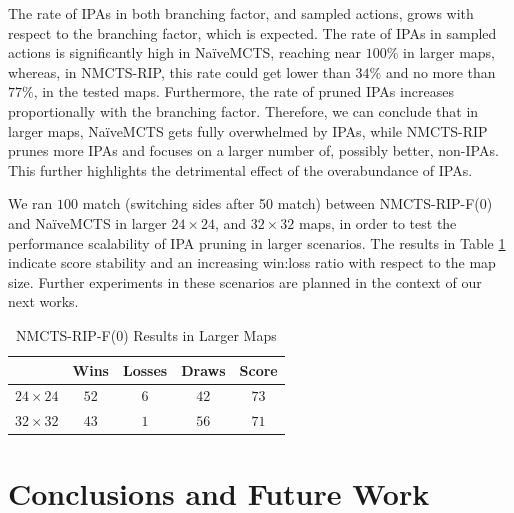 \documentclass[conference]{IEEEtran}
\begin{document}
The rate of IPAs in both branching factor, and sampled actions, grows with respect to the branching factor, which is expected. The rate of IPAs in sampled actions is significantly high in NaïveMCTS, reaching near $100\%$ in larger maps, whereas, in NMCTS-RIP, this rate could get lower than $34\%$ and no more than $77\%$, in the tested maps. Furthermore, the rate of pruned IPAs increases proportionally with the branching factor. Therefore, we can conclude that in larger maps, NaïveMCTS gets fully overwhelmed by IPAs, while NMCTS-RIP prunes more IPAs and focuses on a larger number of, possibly better, non-IPAs. This further highlights the detrimental effect of the overabundance of IPAs.

We ran $100$ match (switching sides after 50 match) between NMCTS-RIP-F($0$) and NaïveMCTS in larger $24\times24$, and $32\times32$ maps, in order to test the performance scalability of IPA pruning in larger scenarios. The results in Table \ref{largeMaps} indicate score stability and an increasing win:loss ratio with respect to the map size. Further experiments in these scenarios are planned in the context of our next works.

\begin{table}[!t]
\renewcommand{\arraystretch}{1.3}
\centering
\label{largeMaps}
\caption{NMCTS-RIP-F($0$) Results in Larger Maps}
\begin{tabular}{c|c|c|c|c} 
\cline{2-5}
\multicolumn{1}{c|}{} & Wins & Losses & Draws & Score  \\ 
\hline \hline
$24\times24$ & $52$ & $6$ & $42$ & $73$ \\
$32\times32$ & $43$ & $1$ & $56$ & $71$ \\
\hline
\end{tabular}
\end{table}



\section{Conclusions and Future Work}
\label{sec:conclusions}






\end{document}
